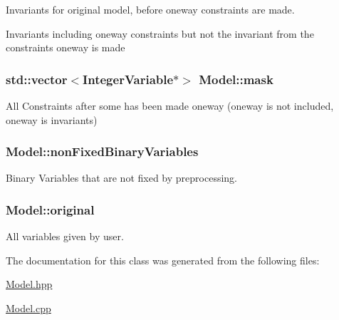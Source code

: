 Invariants for original model, before oneway constraints are made. 

Invariants including oneway constraints but not the invariant from the constraints oneway is made \hypertarget{class_model_a4f7c982b83cb72cd28962e5259d18467}{
\subsubsection[{mask}]{\setlength{\rightskip}{0pt plus 5cm}std\-::vector$<${\bf Integer\-Variable}$\ast$$>$ Model\-::mask\hspace{0.3cm}{\ttfamily [private]}}}\label{class_model_a4f7c982b83cb72cd28962e5259d18467}


All Constraints after some has been made oneway (oneway is not included, oneway is invariants) 

\hypertarget{class_model_ab5c91a03f63f4d70ca6310e38b7d0f60}{
\subsubsection[{non\-Fixed\-Binary\-Variables}]{ Model\-::non\-Fixed\-Binary\-Variables\hspace{0.3cm}{\ttfamily [private]}}}\label{class_model_ab5c91a03f63f4d70ca6310e38b7d0f60}


Binary Variables that are not fixed by preprocessing. 

\hypertarget{class_model_ad313212f7d87f5b57c0a50fe1bc8ab64}{
\subsubsection[{original}]{ Model\-::original\hspace{0.3cm}{\ttfamily [private]}}}\label{class_model_ad313212f7d87f5b57c0a50fe1bc8ab64}


All variables given by user. 



The documentation for this class was generated from the following files\-:\begin{DoxyCompactItemize}
\item 
\hyperlink{_model_8hpp}{Model.\-hpp}\item 
\hyperlink{_model_8cpp}{Model.\-cpp}\end{DoxyCompactItemize}
